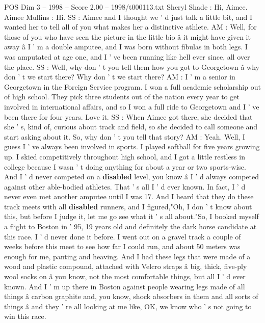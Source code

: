 \begin{textsample}{POS Dim 3 – 1998 – Score 2.00 – 1998/t000113.txt}  \label{ex:f3_pos_081}
Sheryl Shade : Hi, Aimee.
Aimee Mullins : Hi.
SS : Aimee and I thought we ' d just talk a little bit, and I wanted her to tell all of you what makes her a distinctive athlete.
AM : Well, for those of you who have seen the picture in the little bio â it might have given it away â I ' m a double amputee, and I was born without fibulas in both legs.
I was amputated at age one, and I ' ve been running like hell ever since, all over the place.
SS : Well, why don ' t you tell them how you got to Georgetown â why don ' t we start there?
Why don ' t we start there?
AM : I ' m a senior in Georgetown in the Foreign Service program.
I won a full academic scholarship out of high school.
They pick three students out of the nation every year to get involved in international affairs, and so I won a full ride to Georgetown and I ' ve been there for four years.
Love it.
SS : When Aimee got there, she decided that she ' s, kind of, curious about track and field, so she decided to call someone and start asking about it.
So, why don ' t you tell that story?
AM : Yeah.
Well, I guess I ' ve always been involved in sports.
I played softball for five years growing up.
I skied competitively throughout high school, and I got a little restless in college because I wasn ' t doing anything for about a year or two sports-wise.
And I ' d never competed on a \textbf{disabled} level, you know â I ' d always competed against other able-bodied athletes.
That ' s all I ' d ever known.
In fact, I ' d never even met another amputee until I was 17.
And I heard that they do these track meets with all \textbf{disabled} runners, and I figured,"Oh, I don ' t know about this, but before I judge it, let me go see what it ' s all about."So, I booked myself a flight to Boston in ' 95, 19 years old and definitely the dark horse candidate at this race.
I ' d never done it before.
I went out on a gravel track a couple of weeks before this meet to see how far I could run, and about 50 meters was enough for me, panting and heaving.
And I had these legs that were made of a wood and plastic compound, attached with Velcro straps â big, thick, five-ply wool socks on â you know, not the most comfortable things, but all I ' d ever known.
And I ' m up there in Boston against people wearing legs made of all things â carbon graphite and, you know, shock absorbers in them and all sorts of things â and they ' re all looking at me like, OK, we know who ' s not going to win this race.

\end{textsample}
